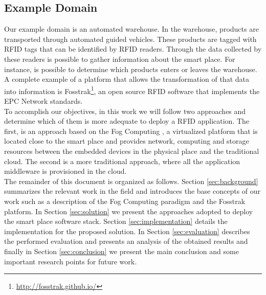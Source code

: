 \subsection{Example Domain}
\label{sub:domain}
Our example domain is an automated warehouse. In the warehouse, products are transported
through automated guided vehicles. These products are tagged with \gls{RFID} tags that can be identified
by \gls{RFID} readers.  Through the data collected by these readers is possible to gather information
about the smart place. For instance, is possible to determine which products enters or leaves the
warehouse. A complete example of a platform that allows the transformation of that data into
information is Fosstrak\footnote{\url{http://fosstrak.github.io/}}, an open source \gls{RFID}
software that implements the \gls{EPC} Network standards.\\

To accomplish our objectives, in this work we will follow two approaches and determine which of them
is more adequate to deploy a \gls{RFID} application. The first, is an approach based on the Fog Computing
\cite{bonomi2012fog}, a virtualized platform that is located close to the smart place and provides network,
computing and storage resources between the embedded devices in the physical place and the traditional
cloud. The second is a more traditional approach, where all the application middleware is provisioned
in the cloud.\\

The remainder of this document is organized as follows. Section \ref{sec:background} summarizes the
relevant work in the field and introduces the base concepts of our work such as a description of the
Fog Computing paradigm and the Fosstrak platform. In Section \ref{sec:solution} we present the approaches
adopted to deploy the smart place software stack. Section \ref{sec:implementation} details the
implementation for the proposed solution. In Section \ref{sec:evaluation} describes the performed
evaluation and presents an analysis of the obtained results and finally in Section \ref{sec:conclusion}
we present the main conclusion and some important research points for future work.
